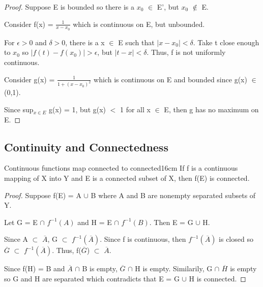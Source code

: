     \begin{proof}
        Suppose E is bounded so there is a $x_0$ $\in$ E', but $x_0$ $\not \in$ E.

        Consider f(x) = $\frac{1}{x - x_0}$ which is continuous on E, but unbounded.

        For $\epsilon > 0$ and $\delta > 0$, there is a x $\in$ E such that
        $|x - x_0| < \delta$.
        Take t close enough to $x_0$ so $|f(t) - f(x_0)| > \epsilon$,
        but $|t - x| < \delta$.
        Thus, f is not uniformly continuous.

        \vspace{0.2cm}

        Consider g(x) = $\frac{1}{1 + (x - x_0)^2}$ which is continuous on E
        and bounded since g(x) $\in$ (0,1).

        Since sup$_{x \in E}$ g(x) = 1, but g(x) $<$ 1 for all x $\in$ E, then
        g has no maximum on E.
    \end{proof}

    \vspace{0.5cm}





\subsection{ Continuity and Connectedness }

    \begin{wtheorem}{Continuous functions map connected to connected}{16cm}
        If f is a continuous mapping of X into Y and E is a connected
        subset of X, then f(E) is connected.
    \end{wtheorem}

    \begin{proof}
        Suppose f(E) = A $\cup$ B where A and B are nonempty separated
        subsets of Y.
        
        Let G = E $\cap$ $f^{-1}(A)$ and H = E $\cap$ $f^{-1}(B)$.
        Then E = G $\cup$ H.

        Since A $\subset$ $\overline{A}$, G $\subset$ $f^{-1}(\overline{A})$.
        Since f is continuous, then $f^{-1}(\overline{A})$ is closed so
        $\overline{G}$ $\subset$ $f^{-1}(\overline{A})$.
        Thus, f($\overline{G}$) $\subset$ $\overline{A}$.

        Since f(H) = B and $\overline{A}$ $\cap$ B is empty,
        $\overline{G}$ $\cap$ H is empty.
        Similarily, G $\cap$ $\overline{H}$ is empty so G and H are separated
        which contradicts that E = G $\cup$ H is connected.
    \end{proof}

